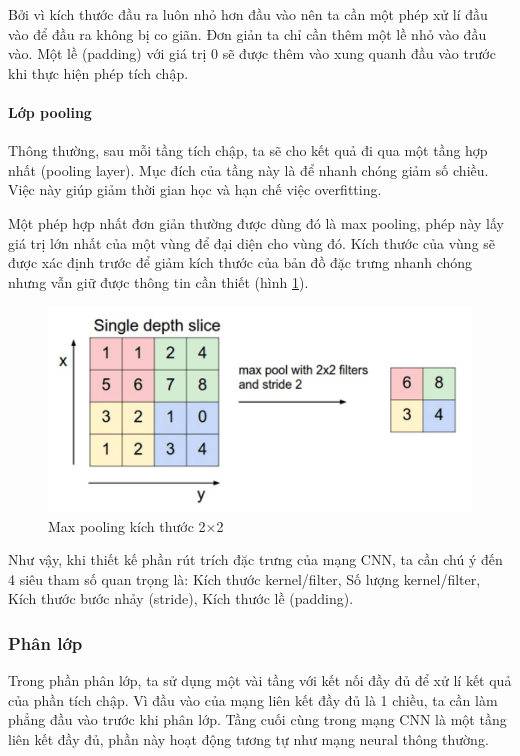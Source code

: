 Bởi vì kích thước đầu ra luôn nhỏ hơn đầu vào nên ta cần một phép xử lí đầu vào để đầu ra không bị co giãn. Đơn giản ta chỉ cần thêm một lề nhỏ vào đầu vào. Một lề (padding) với giá trị 0 sẽ được thêm vào xung quanh đầu vào trước khi thực hiện phép tích chập. 

\paragraph{Lớp pooling}

Thông thường, sau mỗi tầng tích chập, ta sẽ cho kết quả đi qua một tầng hợp nhất (pooling layer). Mục đích của tầng này là để nhanh chóng giảm số chiều. Việc này giúp giảm thời gian học và hạn chế việc overfitting. 

Một phép hợp nhất đơn giản thường được dùng đó là max pooling, phép này lấy giá trị lớn nhất của một vùng để đại diện cho vùng đó. Kích thước của vùng sẽ được xác định trước để giảm kích thước của bản đồ đặc trưng nhanh chóng nhưng vẫn giữ được thông tin cần thiết (hình \ref{fig:maxpooling22}).

\begin{figure}[H]
	\centering
	\includegraphics[width=0.8\linewidth]{images/maxpooling22.png}
	\caption{Max pooling kích thước 2×2}
	\label{fig:maxpooling22}
\end{figure}

Như vậy, khi thiết kế phần rút trích đặc trưng của mạng CNN, ta cần chú ý đến 4 siêu tham số quan trọng là: Kích thước kernel/filter, Số lượng kernel/filter, Kích thước bước nhảy (stride), Kích thước lề (padding).

\subsubsection{Phân lớp}
Trong phần phân lớp, ta sử dụng một vài tầng với kết nối đầy đủ để xử lí kết quả của phần tích chập. Vì đầu vào của mạng liên kết đầy đủ là 1 chiều, ta cần làm phẳng đầu vào trước khi phân lớp. Tầng cuối cùng trong mạng CNN là một tầng liên kết đầy đủ, phần này hoạt động tương tự như mạng neural thông thường.

